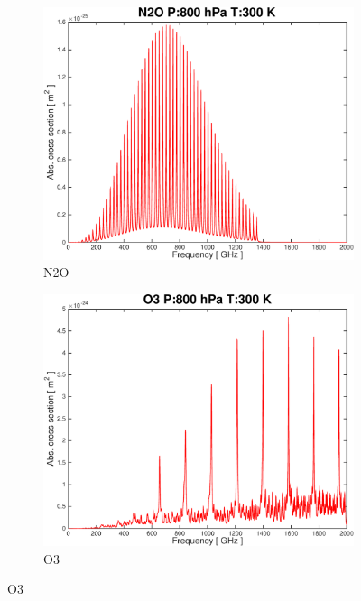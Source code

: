\documentclass[paper=a4, fontsize=11pt]{scrartcl} %
\numberwithin{figure}{section}
\begin{document}
\begin{figure}[t!]
 \begin{subfigure}[b]{0.45\textwidth}
 \includegraphics[width=\textwidth]{plots/plot_xsec_N2O_800hPa_300K.pdf}
 \caption{N2O}
 \end{subfigure}  
 \begin{subfigure}[b]{0.45\textwidth}
 \includegraphics[width=\textwidth]{plots/plot_xsec_O3_800hPa_300K.pdf}
 \caption{O3}
 \end{subfigure}
 

\end{figure}
\end{document}
